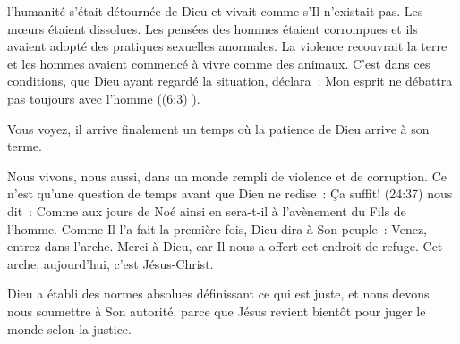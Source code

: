 



 l'humanité s'était
 détournée de Dieu et vivait comme s'Il n'existait pas. Les mœurs étaient
 dissolues. Les pensées des hommes étaient corrompues et ils avaient adopté
 des pratiques sexuelles anormales. La violence recouvrait la terre et les
 hommes avaient commencé à vivre comme des animaux. C'est dans ces conditions,
 que Dieu ayant regardé la situation, déclara~: \og Mon esprit ne débattra pas
 toujours avec l'homme \fg{} ((6:3) \KJF{}). 

Vous voyez, il arrive finalement un temps où la patience de Dieu arrive à son terme. 

Nous vivons, nous aussi, dans un monde rempli de violence et de corruption.
 Ce n'est qu'une question de temps avant que Dieu ne redise~: \og Ça suffit! \fg{} 
 (24:37) nous dit~: \og Comme aux jours de Noé ainsi en sera-t-il
 à l'avènement du Fils de l'homme.\fg{} Comme Il l'a fait la première fois, Dieu
 dira à Son peuple~: \og Venez, entrez dans l'arche. \fg{} Merci à Dieu, car Il
 nous a offert cet endroit de refuge. Cet arche, aujourd'hui, c'est Jésus-Christ.



Dieu a établi des normes absolues définissant ce qui est juste, et nous devons
 nous soumettre à Son autorité, parce que Jésus revient bientôt pour juger le
 monde selon la justice.

\dvrule




